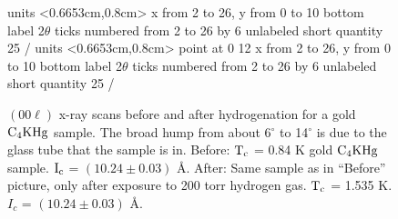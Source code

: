 


\pagestyle{empty}

\begin{figure}
\beginpicture
\setcoordinatesystem units <0.6653cm,0.8cm>
\setplotarea x from 2 to 26, y from 0 to 10
\axis bottom label {2$\theta$} ticks 
	numbered from 2 to 26 by 6
	unlabeled short quantity 25 /
\setcoordinatesystem units <0.6653cm,0.8cm> point at 0 12 
\setplotarea x from 2 to 26, y from 0 to 10
\axis bottom label {2$\theta$} ticks 
	numbered from 2 to 26 by 6
	unlabeled short quantity 25 /
\endpicture
\caption[$(00\ell)$ x-ray scans before and after hydrogenation for a gold
$\rm C_4KHg$ sample.]{$(00\ell)$ x-ray scans before and after hydrogenation
for a gold $\rm C_4KHg$ sample.  The  broad  hump from about 6$^{\circ}$ to
14$^{\circ}$ is due to the glass tube that the sample  is in.  Before: $\rm
T_c$ = 0.84  K gold $\rm C_4KHg$ sample.   $\rm  I_c$  = $(10.24 \pm 0.03)$
\AA.  After:  Same sample as in ``Before''  picture, only after exposure to
200 torr hydrogen  gas.  $\rm T_c$  = 1.535 K.   $I_c$ = $(10.24 \pm  0.03)$
\AA.}
\label{hydxrd}
\end{figure}


